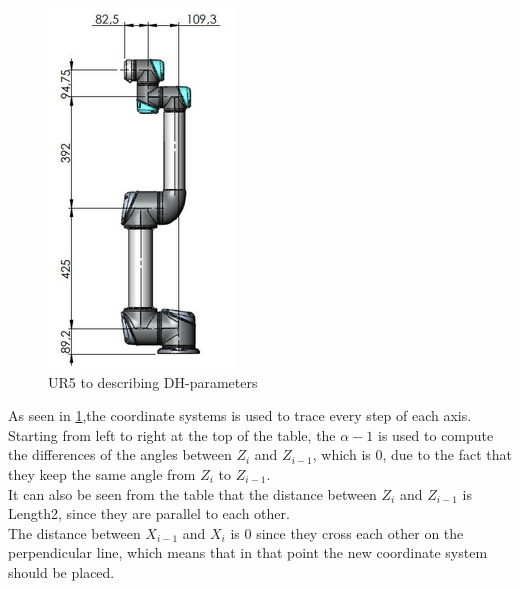\begin{figure}[h!]
    \centering
    \includegraphics[scale=0.79]{Design/UR5measure.png}
    \caption{UR5 to describing DH-parameters \cite{DH}} 
    \label{fig:DH-Table} 
\end{figure}


As seen in \ref{fig:DH-Table},the coordinate systems is used to trace every step of each axis.\\
Starting from left to right at the top of the table, the $\alpha-1$ is used to compute the differences of the angles between $Z_{i}$ and $Z_{i-1}$, which is 0, due to the fact that they keep the same angle from $Z_{i}$  to $Z_{i-1}$.\\
It can also be seen from the table that the distance between $Z_{i}$ and $Z_{i-1}$ is Length2, since they are parallel to each other.\\ 
The distance between $X_{i-1}$ and $X_i$ is 0 since they cross each other on the perpendicular line, which means that in that point the new coordinate system should be placed.\\

